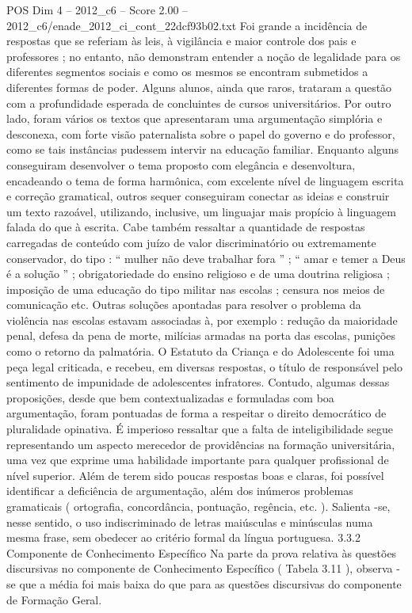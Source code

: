 \begin{textsample}{POS Dim 4 – 2012\_c6 – Score 2.00 – 2012\_c6/enade\_2012\_ci\_cont\_22dcf93b02.txt}
Foi grande a incidência de respostas que se referiam às leis, à vigilância e maior controle dos pais e professores ; no entanto, não demonstram entender a noção de legalidade para os diferentes segmentos sociais e como os mesmos se encontram submetidos a diferentes formas de poder.
Alguns alunos, ainda que raros, trataram a questão com a profundidade esperada de concluintes de cursos universitários.
Por outro lado, foram vários os textos que apresentaram uma argumentação simplória e desconexa, com forte visão paternalista sobre o papel do governo e do professor, como se tais instâncias pudessem intervir na educação familiar.
Enquanto alguns conseguiram desenvolver o tema proposto com elegância e desenvoltura, encadeando o tema de forma harmônica, com excelente nível de linguagem escrita e correção gramatical, outros sequer conseguiram conectar as ideias e construir um texto razoável, utilizando, inclusive, um linguajar mais propício à linguagem falada do que à escrita.
Cabe também ressaltar a quantidade de respostas carregadas de conteúdo com juízo de valor discriminatório ou extremamente conservador, do tipo : “ mulher não deve trabalhar fora ” ; “ amar e temer a Deus é a solução ” ; obrigatoriedade do ensino religioso e de uma doutrina religiosa ; imposição de uma educação do tipo militar nas escolas ; censura nos meios de comunicação etc.
Outras soluções apontadas para resolver o problema da violência nas escolas estavam associadas à, por exemplo : redução da maioridade penal, defesa da pena de morte, milícias armadas na porta das escolas, punições como o retorno da palmatória.
O Estatuto da Criança e do Adolescente foi uma peça legal criticada, e recebeu, em diversas respostas, o título de responsável pelo sentimento de impunidade de adolescentes infratores.
Contudo, algumas dessas proposições, desde que bem contextualizadas e formuladas com boa argumentação, foram pontuadas de forma a respeitar o direito democrático de pluralidade opinativa.
É imperioso ressaltar que a falta de inteligibilidade segue representando um aspecto merecedor de providências na formação universitária, uma vez que exprime uma habilidade importante para qualquer profissional de nível superior.
Além de terem sido poucas respostas boas e claras, foi possível identificar a deficiência de argumentação, além dos inúmeros problemas gramaticais ( ortografia, concordância, pontuação, regência, etc. ).
Salienta -se, nesse sentido, o uso indiscriminado de letras maiúsculas e minúsculas numa mesma frase, sem obedecer ao critério formal da língua portuguesa. 3.3.2 Componente de Conhecimento Específico Na parte da prova relativa às questões discursivas no componente de Conhecimento Específico ( Tabela 3.11 ), observa -se que a média foi mais baixa do que para as questões discursivas do componente de Formação Geral.

\end{textsample}
